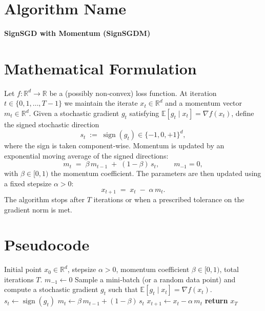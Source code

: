 \documentclass{article}
\newcommand{\sign}{\operatorname{sign}}
\newcommand{\E}{\mathbb{E}}
\newcommand{\R}{\mathbb{R}}
\begin{document}
\section*{Algorithm Name}
\textbf{SignSGD with Momentum (SignSGDM)}  

\section*{Mathematical Formulation}
Let $f:\R^{d}\rightarrow\R$ be a (possibly non‑convex) loss function.  
At iteration $t\in\{0,1,\dots,T-1\}$ we maintain the iterate $x_t\in\R^{d}$ and a momentum vector $m_t\in\R^{d}$.  
Given a stochastic gradient $g_t$ satisfying $\E[g_t\mid x_t]=\nabla f(x_t)$, define the signed stochastic direction
\[
s_t\;:=\;\sign(g_t)\in\{-1,0,+1\}^{d},
\]
where the sign is taken component‑wise.  
Momentum is updated by an exponential moving average of the signed directions:
\begin{equation}
\label{eq:momentum}
m_{t}\;=\;\beta\,m_{t-1}\;+\;(1-\beta)\,s_t ,\qquad m_{-1}=0,
\end{equation}
with $\beta\in[0,1)$ the momentum coefficient.  
The parameters are then updated using a fixed stepsize $\alpha>0$:
\begin{equation}
\label{eq:update}
x_{t+1}\;=\;x_t \;-\;\alpha\, m_t .
\end{equation}
The algorithm stops after $T$ iterations or when a prescribed tolerance on the gradient norm is met.

\section*{Pseudocode}
\begin{algorithm}[H]
\caption{SignSGD with Momentum}
\begin{algorithmic}[1]
\Require Initial point $x_0\in\R^{d}$, stepsize $\alpha>0$, momentum coefficient $\beta\in[0,1)$, total iterations $T$.
\State $m_{-1}\gets 0$ 
    \State Sample a mini‑batch (or a random data point) and compute a stochastic gradient $g_t$ such that $\E[g_t\mid x_t]=\nabla f(x_t)$.
    \State $s_t\gets \sign(g_t)$ 
    \State $m_t\gets \beta\,m_{t-1}+(1-\beta)\,s_t$ 
    \State $x_{t+1}\gets x_t-\alpha\, m_t$ 
\EndFor
\State \textbf{return} $x_T$
\end{algorithmic}
\end{algorithm}
\end{document}

